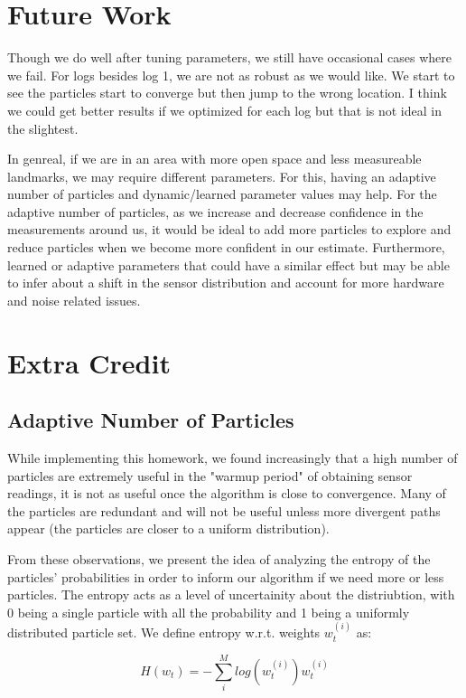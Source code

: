 \documentclass[12pt, a4paper]{article}
\begin{document}
\section{Future Work}
Though we do well after tuning parameters, we still have occasional cases where we fail. For logs besides log 1, we are not as robust as we would like. We start to see the particles start to converge but then jump to the wrong location. I think we could get better results if we optimized for each log but that is not ideal in the slightest.

In genreal, if we are in an area with more open space and less measureable landmarks, we may require different parameters. For this, having an adaptive number of particles and dynamic/learned parameter values may help. For the adaptive number of particles, as we increase and decrease confidence in the measurements around us, it would be ideal to add more particles to explore and reduce particles when we become more confident in our estimate. Furthermore, learned or adaptive parameters that could have a similar effect but may be able to infer about a shift in the sensor distribution and account for more hardware and noise related issues.

\section{Extra Credit}

\subsection{Adaptive Number of Particles}

While implementing this homework, we found increasingly that a high number of particles are extremely useful in the "warmup period" of obtaining sensor readings, it is not as useful once the algorithm is close to convergence. Many of the particles are redundant and will not be useful unless more divergent paths appear (the particles are closer to a uniform distribution).

From these observations, we present the idea of analyzing the entropy of the particles' probabilities in order to inform our algorithm if we need more or less particles. The entropy acts as a level of uncertainity about the distriubtion, with 0 being a single particle with all the probability and 1 being a uniformly distributed particle set. We define entropy w.r.t. weights $w_t^{(i)}$ as:

$$ H(w_t) = - \sum_{i}^{M} log(w_t^{(i)})w_t^{(i)} $$
\end{document}
